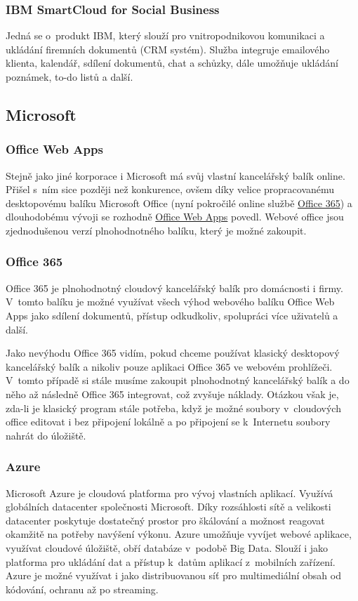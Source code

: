 \subsubsection{IBM SmartCloud for Social Business}
Jedná se o~produkt IBM, který slouží pro vnitropodnikovou komunikaci a ukládání firemních dokumentů (CRM systém). Služba integruje emailového klienta, kalendář, sdílení dokumentů, chat a schůzky, dále umožňuje ukládání poznámek, to-do listů a další.\cite{ibm:social}

\subsection{Microsoft}
\subsubsection{Office Web Apps}
Stejně jako jiné korporace i Microsoft má svůj vlastní kancelářský balík online. Přišel s~ním sice později než konkurence, ovšem díky velice propracovanému desktopovému balíku Microsoft Office (nyní pokročilé online službě \href{https://office.microsoft.com}{Office 365}) a dlouhodobému vývoji se rozhodně \href{https://skydrive.live.com}{Office Web Apps} povedl. Webové office jsou zjednodušenou verzí plnohodnotného balíku, který je možné zakoupit.

\subsubsection{Office 365}
Office 365 je plnohodnotný cloudový kancelářský balík pro domácnosti i firmy. V~tomto balíku je možné využívat všech výhod webového balíku Office Web Apps jako sdílení dokumentů, přístup odkudkoliv, spolupráci více uživatelů a další. 

Jako nevýhodu Office 365 vidím, pokud chceme používat klasický desktopový kancelářský balík a nikoliv pouze aplikaci Office 365 ve webovém prohlížeči. V~tomto případě si stále musíme zakoupit plnohodnotný kancelářský balík a do něho až následně Office 365 integrovat, což zvyšuje náklady. Otázkou však je, zda-li je klasický program stále potřeba, když je možné soubory v~cloudových office editovat i bez připojení lokálně a po připojení se k~Internetu soubory nahrát do úložiště.

\subsubsection{Azure}
\label{sec:Azure}
Microsoft Azure je cloudová platforma pro vývoj vlastních aplikací. Využívá globálních datacenter společnosti Microsoft. Díky rozsáhlosti sítě a velikosti datacenter poskytuje dostatečný prostor pro škálování a možnost reagovat okamžitě na potřeby navýšení výkonu. Azure umožňuje vyvíjet webové aplikace, využívat cloudové úložiště, obří databáze v~podobě Big Data. Slouží i jako platforma pro ukládání dat a přístup k~datům aplikací z~mobilních zařízení. Azure je možné využívat i jako distribuovanou síť pro multimediální obsah od kódování, ochranu až po streaming.\cite{ms:azure}

